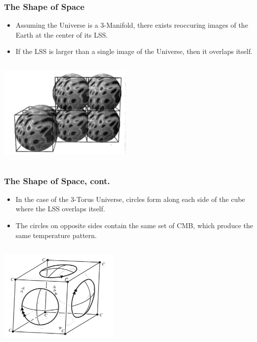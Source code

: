\documentclass[13pt]{beamer}
\begin{document}
\begin{frame}
\frametitle{The Shape of Space}
  \begin{itemize}
    \item Assuming the Universe is a 3-Manifold, there exists reoccuring images of the Earth at the center of its LSS.
    \item If the LSS is larger than a single image of the Universe, then it overlaps itself.
  \end{itemize}

  \begin{columns}[c] %
     \centering
     \includegraphics[height=4.5cm]{./img/LssIntersecting} %
  \end{columns}
\end{frame}

\begin{frame}
\frametitle{The Shape of Space, cont.}
  \begin{itemize}
    \item In the case of the 3-Torus Universe, circles form along each side of the cube where the LSS overlaps itself.
    \item The circles on opposite sides contain the same set of CMB, which produce the same temperature pattern.
  \end{itemize}

  \begin{columns}[c] %
     \centering
     \includegraphics[height=4.5cm]{./img/shapeofspace} %
  \end{columns}
\end{frame}
\end{document}
